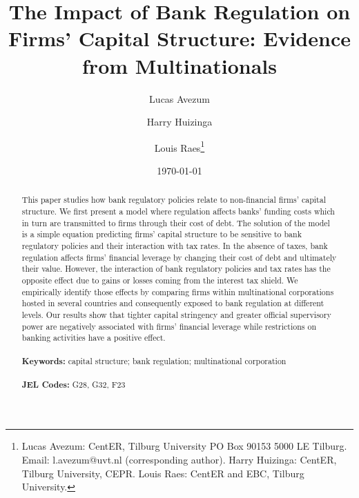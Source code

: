 \documentclass[12pt]{article}
\begin{document}
	
	\begin{titlepage}
		\title{The Impact of Bank Regulation on Firms' Capital Structure: Evidence from Multinationals}
		
		\author{Lucas Avezum \and Harry Huizinga \and Louis Raes\thanks{Lucas Avezum: CentER, Tilburg University PO Box 90153 5000 LE Tilburg. Email:
				l.avezum@uvt.nl (corresponding author). Harry Huizinga: CentER, Tilburg University, CEPR. Louis Raes: CentER and EBC, Tilburg University.}}
		\date{\today}
		\maketitle
		\begin{abstract}
			\noindent This paper studies how bank regulatory policies relate to non-financial firms' capital structure. We first present a model where regulation affects banks' funding costs which in turn are transmitted to firms through their cost of debt. The solution of the model is a simple equation predicting firms' capital structure to be sensitive to bank regulatory policies and their interaction with tax rates. In the absence of taxes, bank regulation affects firms' financial leverage by changing their cost of debt and ultimately their value. However, the interaction of bank regulatory policies and tax rates has the opposite effect due to gains or losses coming from the interest tax shield. We empirically identify those effects by comparing firms within multinational corporations hosted in several countries and consequently exposed to bank regulation at different levels. Our results show that tighter capital stringency and greater official supervisory power are negatively associated with firms' financial leverage while restrictions on banking activities have a positive effect.   \\
			\vspace{0in}\\
			\noindent\textbf{Keywords:} capital structure; bank regulation; multinational corporation\\
			\vspace{0in}\\
			\noindent\textbf{JEL Codes:} G28, G32, F23 \\
			
			\bigskip
		\end{abstract}
		\setcounter{page}{0}
		\thispagestyle{empty}
	\end{titlepage}
	\pagebreak \newpage
	
	
	\normalem
	
\end{document}
